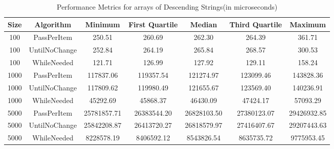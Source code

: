 \documentclass{article}
\begin{document}
\begin{table}[htbp]
    \centering
    \begin{tabular}{ccccccc}
        \toprule
        \textbf{Size} & \textbf{Algorithm} & \textbf{Minimum} & \textbf{First Quartile} & \textbf{Median} & \textbf{Third Quartile} & \textbf{Maximum} \\
        \midrule
        100 & PassPerItem & 250.51 & 260.69 & 262.30 & 264.39 & 361.71 \\
        100 & UntilNoChange & 252.84 & 264.19 & 265.84 & 268.57 & 300.53 \\
        100 & WhileNeeded & 121.71 & 126.99 & 127.92 & 129.11 & 158.24 \\
        1000 & PassPerItem & 117837.06 & 119357.54 & 121274.97 & 123099.46 & 143828.36 \\
        1000 & UntilNoChange & 117809.62 & 119980.49 & 121655.67 & 123569.40 & 140236.91 \\
        1000 & WhileNeeded & 45292.69 & 45868.37 & 46430.09 & 47424.17 & 57093.29 \\
        5000 & PassPerItem & 25781857.71 & 26383544.20 & 26828103.50 & 27380123.07 & 29426932.85 \\
        5000 & UntilNoChange & 25842208.87 & 26413720.27 & 26818579.97 & 27416407.67 & 29207443.63 \\
        5000 & WhileNeeded & 8228578.19 & 8406592.12 & 8543826.54 & 8635735.72 & 9775953.45 \\
        \bottomrule
    \end{tabular}
    \caption{Performance Metrics for arrays of Descending Strings(in microseconds)}
    \label{tab:performance_4}
\end{table}
\end{document}
